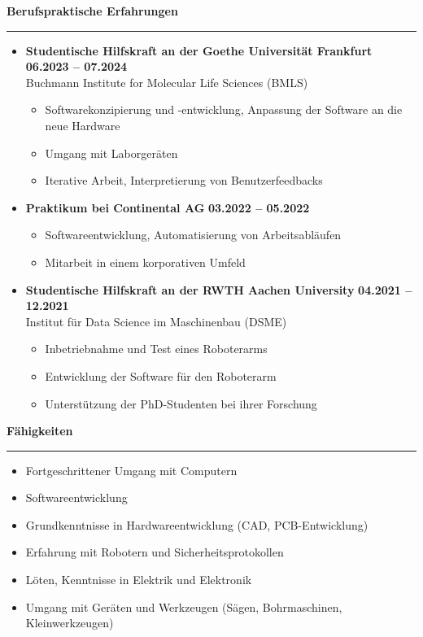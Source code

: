\documentclass[12pt]{article} %
\newcommand{\HighlightedText}[1] {{\textbf{#1}}}
\newcommand{\PlaceAndTime}[2] {\HighlightedText{#1} \hfill \HighlightedText{#2}}
\newenvironment{ItemizeSection}[1]{
    \vspace{1mm}
    \HighlightedText{#1}
    \vspace{0.5mm}
    {\color{custom_blue} \hrule}
    \begin{itemize}[left=0.5em, topsep=0pt, itemsep=0pt, label={$\bullet$}]
}{
    \end{itemize}
}
\newenvironment{ItemizeSubsection}{
    \begin{itemize}[left=0.5em, topsep=-999pt, itemsep=0pt, label={$\circ$}]
}{
    \end{itemize}
}
\begin{document}
\begin{ItemizeSection}{Berufspraktische Erfahrungen}
    \item \PlaceAndTime{Studentische Hilfskraft an der Goethe Universität Frankfurt}{06.2023 -- 07.2024} \\
    Buchmann Institute for Molecular Life Sciences (BMLS)
    \begin{ItemizeSubsection}
        \item Softwarekonzipierung und -entwicklung, Anpassung der Software an die neue Hardware
        \item Umgang mit Laborgeräten
        \item Iterative Arbeit, Interpretierung von Benutzerfeedbacks
    \end{ItemizeSubsection}

    \item \PlaceAndTime{Praktikum bei Continental AG}{03.2022 -- 05.2022}
    \begin{ItemizeSubsection}
        \item Softwareentwicklung, Automatisierung von Arbeitsabläufen
        \item Mitarbeit in einem korporativen Umfeld
    \end{ItemizeSubsection}

    \item \PlaceAndTime{Studentische Hilfskraft an der RWTH Aachen University}{04.2021 -- 12.2021} \\
    Institut für Data Science im Maschinenbau (DSME)
    \begin{ItemizeSubsection}
        \item Inbetriebnahme und Test eines Roboterarms
        \item Entwicklung der Software für den Roboterarm
        \item Unterstützung der PhD-Studenten bei ihrer Forschung
    \end{ItemizeSubsection}
\end{ItemizeSection}

\newpage
\begin{ItemizeSection}{Fähigkeiten}
    \item Fortgeschrittener Umgang mit Computern
    \item Softwareentwicklung
    \item Grundkenntnisse in Hardwareentwicklung (CAD, PCB-Entwicklung)
    \item Erfahrung mit Robotern und Sicherheitsprotokollen
    \item Löten, Kenntnisse in Elektrik und Elektronik
    \item Umgang mit Geräten und Werkzeugen (Sägen, Bohrmaschinen, Kleinwerkzeugen)
\end{ItemizeSection}
\end{document}
